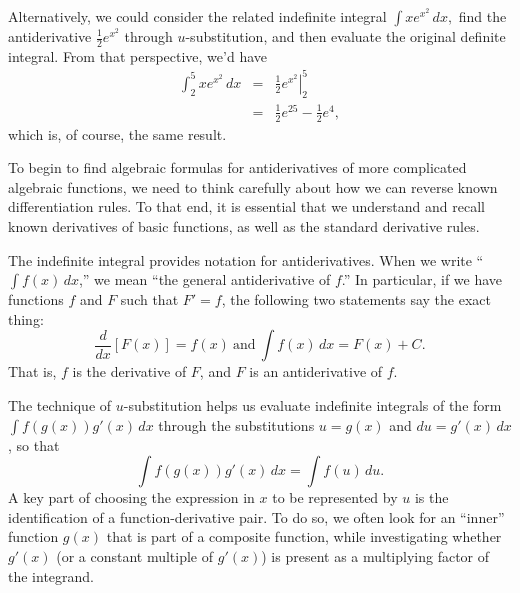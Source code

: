 Alternatively, we could consider the related indefinite integral $\int xe^{x^2} \, dx,$ find the antiderivative $\frac{1}{2}e^{x^2}$ through $u$-substitution, and then evaluate the original definite integral.  From that perspective, we'd have
\begin{eqnarray*}
\int_{2}^{5} xe^{x^2} \, dx & = & \left. \frac{1}{2}e^{x^2} \right|_{2}^{5} \\
				& = & \frac{1}{2}e^{25} - \frac{1}{2}e^4,
\end{eqnarray*}
which is, of course, the same result.




\begin{summary}
\item To begin to find algebraic formulas for antiderivatives of more complicated algebraic functions, we need to think carefully about how we can reverse known differentiation rules.  To that end, it is essential that we understand and recall known derivatives of basic functions, as well as the standard derivative rules.
\item The indefinite integral provides notation for antiderivatives.  When we write ``$\int f(x) \, dx$,'' we mean ``the general antiderivative of $f$.''  In particular, if we have functions $f$ and $F$ such that $F' = f$, the following two statements say the exact thing:
$$\frac{d}{dx}[F(x)] = f(x) \ \mbox{and} \ \int f(x) \, dx = F(x) + C.$$
That is, $f$ is the derivative of $F$, and $F$ is an antiderivative of $f$.
\item The technique of $u$-substitution helps us evaluate indefinite integrals of the form $\int f(g(x))g'(x) \, dx$ through the substitutions $u = g(x)$ and $du = g'(x) \, dx$, so that
$$\int f(g(x))g'(x) \, dx = \int f(u) \, du.$$
A key part of choosing the expression in $x$ to be represented by $u$ is the identification of a function-derivative pair.  To do so, we often look for an ``inner'' function $g(x)$ that is part of a composite function, while investigating whether $g'(x)$ (or a constant multiple of $g'(x)$) is present as a multiplying factor of the integrand.
\end{summary}

\nin \hrulefill

 

\clearpage
